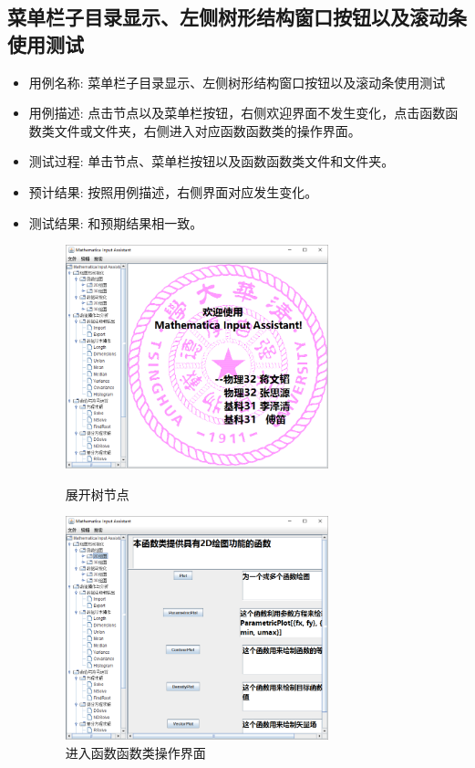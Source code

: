 \documentclass[hyperref, UTF8
,bookmarksnumbered=true, oneside]{ctexbook}
\begin{document}
		\subsection{菜单栏子目录显示、左侧树形结构窗口按钮以及滚动条使用测试} %
		\begin{itemize}
			\item 用例名称: 菜单栏子目录显示、左侧树形结构窗口按钮以及滚动条使用测试
			\item 用例描述: 点击节点以及菜单栏按钮，右侧欢迎界面不发生变化，点击函数函数类文件或文件夹，右侧进入对应函数函数类的操作界面。
			\item 测试过程: 单击节点、菜单栏按钮以及函数函数类文件和文件夹。
			\item 预计结果: 按照用例描述，右侧界面对应发生变化。
			\item 测试结果:	和预期结果相一致。

				\begin{figure}[!h]
	                \begin{minipage}[b]{0.45\textwidth}
	                \centering
	                \includegraphics[width=3in]{2.png}
	                \caption{展开树节点}
	                \label{pic:MathPack}
	                \end{minipage}%
	                \hspace{0.1\textwidth}%
	                \begin{minipage}[b]{0.45\textwidth}
	                \centering
	                \includegraphics[width=3in]{3.png}
	                \caption{进入函数函数类操作界面}
	                \label{pic:GUIPack}
	                \end{minipage}
            	\end{figure}

		\end{itemize}
		
\end{document}
